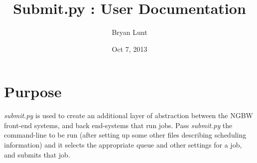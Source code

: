 \documentclass[12pt]{amsart}
\title{Submit.py : User Documentation}
\author{Bryan Lunt}
\date{Oct 7, 2013} %
\newcommand{\filename}[1]{{\it #1 }}
\newcommand{\theprog}[0]{\filename{submit.py}}
\begin{document}
\maketitle
\tableofcontents

\section{Purpose}
\theprog is used to create an additional layer of abstraction between the NGBW front-end systems, and back end-systems that run jobs. Pass \theprog the command-line to be run (after setting up some other files describing scheduling information) and it selects the appropriate queue and other settings for a job, and submits that job.

\pagebreak


\pagebreak


\pagebreak


\pagebreak

\end{document}
